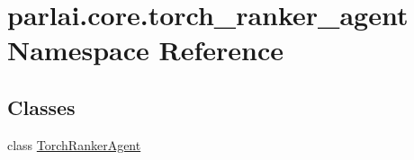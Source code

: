 \hypertarget{namespaceparlai_1_1core_1_1torch__ranker__agent}{}\section{parlai.\+core.\+torch\+\_\+ranker\+\_\+agent Namespace Reference}
\label{namespaceparlai_1_1core_1_1torch__ranker__agent}
\subsection*{Classes}
\begin{DoxyCompactItemize}
\item 
class \hyperlink{classparlai_1_1core_1_1torch__ranker__agent_1_1TorchRankerAgent}{Torch\+Ranker\+Agent}
\end{DoxyCompactItemize}
